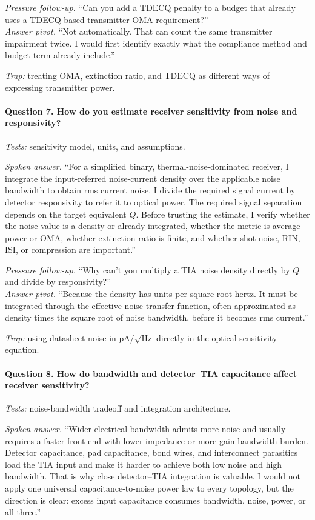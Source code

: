 \textit{Pressure follow-up.} ``Can you add a TDECQ penalty to a budget that
already uses a TDECQ-based transmitter OMA requirement?''\\
\textit{Answer pivot.} ``Not automatically. That can count the same transmitter
impairment twice. I would first identify exactly what the compliance method and
budget term already include.''

\textit{Trap:} treating OMA, extinction ratio, and TDECQ as different ways of
expressing transmitter power.

\paragraph{Question 7. How do you estimate receiver sensitivity from noise and
responsivity?}
\textit{Tests:} sensitivity model, units, and assumptions.

\textit{Spoken answer.}
``For a simplified binary, thermal-noise-dominated receiver, I integrate the
input-referred noise-current density over the applicable noise bandwidth to
obtain rms current noise. I divide the required signal current by detector
responsivity to refer it to optical power. The required signal separation depends
on the target equivalent $Q$. Before trusting the estimate, I verify whether the
noise value is a density or already integrated, whether the metric is average
power or OMA, whether extinction ratio is finite, and whether shot noise, RIN,
ISI, or compression are important.''

\textit{Pressure follow-up.} ``Why can't you multiply a TIA noise density
directly by $Q$ and divide by responsivity?''\\
\textit{Answer pivot.} ``Because the density has units per square-root hertz. It
must be integrated through the effective noise transfer function, often
approximated as density times the square root of noise bandwidth, before it
becomes rms current.''

\textit{Trap:} using datasheet noise in pA/$\sqrt{\mathrm{Hz}}$ directly in the
optical-sensitivity equation.

\paragraph{Question 8. How do bandwidth and detector--TIA capacitance affect
receiver sensitivity?}
\textit{Tests:} noise-bandwidth tradeoff and integration architecture.

\textit{Spoken answer.}
``Wider electrical bandwidth admits more noise and usually requires a faster
front end with lower impedance or more gain-bandwidth burden. Detector
capacitance, pad capacitance, bond wires, and interconnect parasitics load the
TIA input and make it harder to achieve both low noise and high bandwidth. That
is why close detector--TIA integration is valuable. I would not apply one
universal capacitance-to-noise power law to every topology, but the direction is
clear: excess input capacitance consumes bandwidth, noise, power, or all three.''

